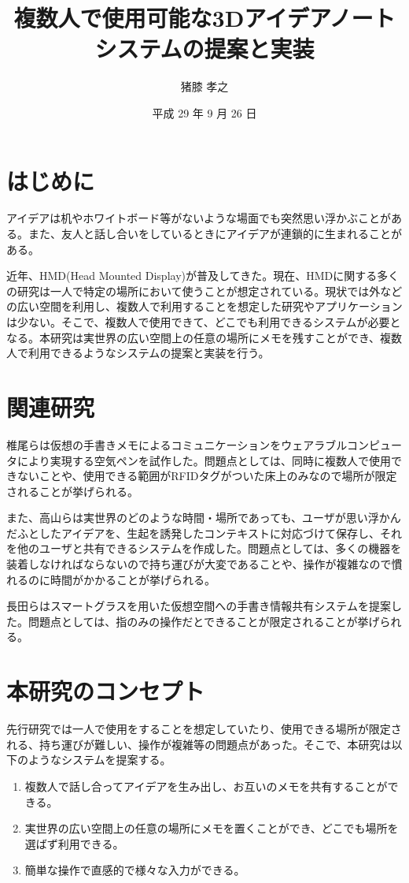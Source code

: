 \documentclass[twocolumn, a4paper]{UECIEresume}
\title{複数人で使用可能な3Dアイデアノートシステムの提案と実装}
\date{平成 29 年 9 月 26 日}
\affiliation{情報学専攻 メディア情報学プログラム}
\author{猪膝 孝之}
\begin{document}
\maketitle

\section{はじめに}
アイデアは机やホワイトボード等がないような場面でも突然思い浮かぶことがある。また、友人と話し合いをしているときにアイデアが連鎖的に生まれることがある。

近年、HMD(Head Mounted Display)が普及してきた。現在、HMDに関する多くの研究は一人で特定の場所において使うことが想定されている。現状では外などの広い空間を利用し、複数人で利用することを想定した研究やアプリケーションは少ない。そこで、複数人で使用できて、どこでも利用できるシステムが必要となる。本研究は実世界の広い空間上の任意の場所にメモを残すことができ、複数人で利用できるようなシステムの提案と実装を行う。

\section{関連研究}
椎尾ら\cite{tex1,tex2}は仮想の手書きメモによるコミュニケーションをウェアラブルコンピュータにより実現する空気ペンを試作した。問題点としては、同時に複数人で使用できないことや、使用できる範囲がRFIDタグがついた床上のみなので場所が限定されることが挙げられる。

また、高山ら\cite{tex3,tex4}は実世界のどのような時間・場所であっても、ユーザが思い浮かんだふとしたアイデアを、生起を誘発したコンテキストに対応づけて保存し、それを他のユーザと共有できるシステムを作成した。問題点としては、多くの機器を装着しなければならないので持ち運びが大変であることや、操作が複雑なので慣れるのに時間がかかることが挙げられる。

長田ら\cite{tex5}はスマートグラスを用いた仮想空間への手書き情報共有システムを提案した。問題点としては、指のみの操作だとできることが限定されることが挙げられる。


\section{本研究のコンセプト}
先行研究では一人で使用をすることを想定していたり、使用できる場所が限定される、持ち運びが難しい、操作が複雑等の問題点があった。そこで、本研究は以下のようなシステムを提案する。
\begin{enumerate}[(1)]
 \item 複数人で話し合ってアイデアを生み出し、お互いのメモを共有することができる。
 \item 実世界の広い空間上の任意の場所にメモを置くことができ、どこでも場所を選ばず利用できる。
 \item 簡単な操作で直感的で様々な入力ができる。
\end{enumerate}
\end{document}
